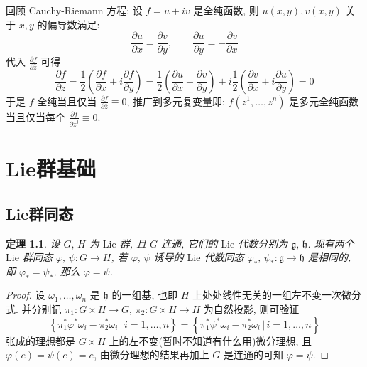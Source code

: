\documentclass{book}
\newtheorem{theorem}{\indent 定理}[section]
\newcommand{\pd}[2]{\frac{\partial #1}{\partial #2}}
\begin{document}
        回顾 Cauchy-Riemann 方程: 设 $f=u+iv$ 是全纯函数, 则 $u(x,y),v(x,y)$ 关于 $x,y$ 的偏导数满足:
        \begin{equation*}
            \pd{u}{x}=\pd{v}{y},\qquad \pd{u}{y}=-\pd{v}{x}
        \end{equation*}
        代入 $\pd{f}{\bar{z}}$ 可得
        \begin{equation*}
            \pd{f}{\bar{z}}=\frac{1}{2}\left(\pd{f}{x}+i\pd{f}{y}\right)=\frac{1}{2}\left(\pd{u}{x}-\pd{v}{y}\right)+i\frac{1}{2}\left(\pd{v}{x}+i\pd{u}{y}\right)=0
        \end{equation*}
        于是 $f$ 全纯当且仅当 $\pd{f}{\bar{z}}\equiv0$, 推广到多元复变量即: $f(z^1,\dots,z^n)$ 是多元全纯函数当且仅当每个 $\pd{f}{\bar{z}^j}\equiv0$.
        
    \chapter{Lie群基础}
    \section{Lie群同态}
        \begin{theorem}
            设 $G,\,H$ 为 $\mathrm{Lie}$ 群, 且 $G$ 连通, 它们的 $\mathrm{Lie}$ 代数分别为 $\mathfrak{g,\,h}$. 现有两个 $\mathrm{Lie}$ 群同态 $\varphi,\,\psi:G\rightarrow H$, 
            若 $\varphi,\,\psi$ 诱导的 $\mathrm{Lie}$ 代数同态 $\varphi_*,\,\psi_*:\mathfrak{g}\rightarrow\mathfrak{h}$ 是相同的, 即 $\varphi_*=\psi_*$, 那么 $\varphi=\psi$.
        \end{theorem}
        \begin{proof}
            设 $\omega_1,\dots,\omega_n$ 是 $\mathfrak{h}$ 的一组基, 也即 $H$ 上处处线性无关的一组左不变一次微分式.
            并分别记 $\pi_1:G\times H\rightarrow G$, $\pi_2:G\times H\rightarrow H$ 为自然投影, 则可验证
            \begin{equation*}
                \left\{\pi_1^*\varphi^*\omega_i-\pi_2^*\omega_i\,\Big|\,i=1,\dots,n\right\} = \left\{\pi_1^*\psi^*\omega_i-\pi_2^*\omega_i\,\Big|\,i=1,\dots,n\right\}
            \end{equation*}
            张成的理想都是 $G\times H$ 上的左不变(暂时不知道有什么用)微分理想, 且 $\varphi(e) = \psi(e) = e$, 由微分理想的结果再加上 $G$ 是连通的可知 $\varphi = \psi$.
        \end{proof}
\end{document}
